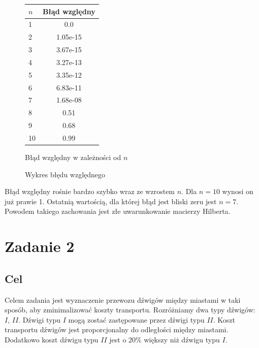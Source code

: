 \documentclass{article}
\begin{document}
\begin{figure}[h]
    \centering
    \begin{minipage}{0.45\textwidth}
        \centering
        \begin{tabular}{lc}
            \hline
            $n$ & Błąd względny \\
            \hline
            1 & 0.0 \\
            2 & 1.05e-15 \\
            3 & 3.67e-15 \\
            4 & 3.27e-13 \\
            5 & 3.35e-12 \\
            6 & 6.83e-11 \\
            7 & 1.68e-08 \\
            8 & 0.51 \\
            9 & 0.68 \\
            10 & 0.99 \\
            \hline
        \end{tabular}
        \caption{Błąd względny w zależności od $n$}
        \label{tab:zad1}
    \end{minipage}
    \begin{minipage}{0.45\textwidth}
        \centering
        \caption{Wykres błędu względnego}
        \label{fig:zad1}
    \end{minipage}
\end{figure}

Błąd względny rośnie bardzo szybko wraz ze wzrostem $n$. Dla $n = 10$ wynosi on już prawie 1. 
Ostatnią wartością, dla której błąd jest bliski zeru jest $n = 7$.
Powodem takiego zachowania jest złe uwarunkowanie macierzy Hilberta.

\section{Zadanie 2}
\subsection{Cel}
Celem zadania jest wyznaczenie przewozu dźwigów między miastami w taki sposób, aby zminimalizować koszty transportu.
Rozróżniamy dwa typy dźwigów: $I$, $II$. Dźwigi typu $I$ mogą zostać zastępowane przez dźwigi typu $II$. 
Koszt transportu dźwigów jest proporcjonalny do odległości między miastami. Dodatkowo koszt dźwigu typu $II$ jest o $20\%$ większy niż dźwigu typu $I$.
\end{document}
